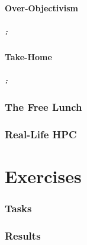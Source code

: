 \documentclass[9pt,xcolor=table]{beamer}
\begin{document}
\subsection{Over-Objectivism}
\begin{frame}
\frametitle{\insertsectionhead{}: \insertsubsectionhead{}}
\end{frame}

\subsection{Take-Home}
\begin{frame}
\frametitle{\insertsectionhead{}: \insertsubsectionhead{}}
\end{frame}

\section{The Free Lunch}
\section{Real-Life HPC}


\part{Exercises}
\section{Tasks}
\section{Results}
\end{document}
